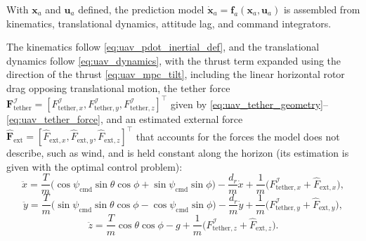 With $\mathbf{x}_a$ and $\mathbf{u}_a$ defined, the prediction model $\dot{\mathbf{x}}_a = \mathbf{f}_a(\mathbf{x}_a,\mathbf{u}_a)$ is assembled from kinematics, translational dynamics, attitude lag, and command integrators.

The kinematics follow \eqref{eq:uav_pdot_inertial_def}, and the translational dynamics follow \eqref{eq:uav_dynamics}, with the thrust term expanded using the direction of the thrust \eqref{eq:uav_mpc_tilt}, including the linear horizontal rotor drag opposing translational motion, the tether force $\mathbf{F}_{\mathrm{tether}}^{\mathcal{I}} = [F_{\mathrm{tether},x}^{\mathcal{I}}, F_{\mathrm{tether},y}^{\mathcal{I}}, F_{\mathrm{tether},z}^{\mathcal{I}}]^\top$ given by \eqref{eq:uav_tether_geometry}--\eqref{eq:uav_tether_force}, and an estimated external force $\hat{\mathbf{F}}_{\mathrm{ext}} = [\hat F_{\mathrm{ext},x}, \hat F_{\mathrm{ext},y}, \hat F_{\mathrm{ext},z}]^\top$ that accounts for the forces the model does not describe, such as wind, and is held constant along the horizon (its estimation is given with the optimal control problem):
\begin{equation}
    \ddot x = \frac{T}{m}\big(\cos\psi_{\mathrm{cmd}}\sin\theta\cos\phi+\sin\psi_{\mathrm{cmd}}\sin\phi\big) - \frac{d_r}{m}\dot{x} + \frac{1}{m}\big(F_{\mathrm{tether},x}^{\mathcal{I}} + \hat F_{\mathrm{ext},x}\big),
    \label{eq:uav_mpc_xddot}
\end{equation}
\begin{equation}
    \ddot y = \frac{T}{m}\big(\sin\psi_{\mathrm{cmd}}\sin\theta\cos\phi-\cos\psi_{\mathrm{cmd}}\sin\phi\big) - \frac{d_r}{m}\dot{y} + \frac{1}{m}\big(F_{\mathrm{tether},y}^{\mathcal{I}} + \hat F_{\mathrm{ext},y}\big),
    \label{eq:uav_mpc_yddot}
\end{equation}
\begin{equation}
    \ddot z = \frac{T}{m}\cos\theta\cos\phi - g + \frac{1}{m}\big(F_{\mathrm{tether},z}^{\mathcal{I}} + \hat F_{\mathrm{ext},z}\big).
    \label{eq:uav_mpc_zddot}
\end{equation}

